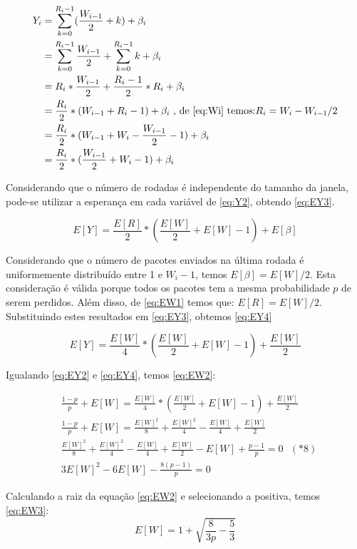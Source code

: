 \begin{align} \label{eq:Y2}
\nonumber Y_i &= \sum_{k = 0}^{R_i - 1} (\frac{W_{i - 1}}{2} + k) + \beta_i \\
\nonumber &= \sum_{k = 0}^{R_i - 1} \frac{W_{i - 1}}{2} + \sum_{k = 0}^{R_i - 1} k + \beta_i \\
\nonumber &= R_i * \frac{W_{i - 1}}{2} + \frac{R_i - 1}{2} * R_i + \beta_i \\
\nonumber &= \frac{R_i}{2} * (W_{i - 1} + R_i - 1) + \beta_i \text{ , de \eqref{eq:Wi} temos:$R_i = W_i - W_{i-1}/2$} \\
\nonumber &= \frac{R_i}{2} * (W_{i - 1} + W_i - \frac{W_{i-1}}{2} - 1) + \beta_i \\
&= \frac{R_i}{2} * (\frac{W_{i-1}}{2} + W_i - 1) + \beta_i 
\end{align}

Considerando que o número de rodadas é independente do tamanho da janela, pode-se utilizar
a esperança em cada variável de \eqref{eq:Y2}, obtendo \eqref{eq:EY3}.

\begin{equation} \label{eq:EY3}
E[Y] = \frac{E[R]}{2} * (\frac{E[W]}{2} + E[W] - 1) + E[\beta] 
\end{equation}

Considerando que o número de pacotes enviados na última rodada é uniformemente distribuído entre
1 e $W_i - 1$, temos $E[\beta] = E[W]/2$. Esta consideração é válida porque todos os pacotes tem 
a mesma probabilidade $p$ de serem perdidos. Além disso, de \eqref{eq:EW1} temos que: $E[R]=E[W]/2$.
Substituindo estes resultados em \eqref{eq:EY3}, obtemos \eqref{eq:EY4}

\begin{equation} \label{eq:EY4}
E[Y] = \frac{E[W]}{4} * (\frac{E[W]}{2} + E[W] - 1) + \frac{E[W]}{2}
\end{equation}

Igualando \eqref{eq:EY2} e \eqref{eq:EY4}, temos \eqref{eq:EW2}:

\begin{align} \label{eq:EW2}
\nonumber & \frac{1 - p}{p} + E[W] = \frac{E[W]}{4} * (\frac{E[W]}{2} + E[W] - 1) + \frac{E[W]}{2} \\
\nonumber & \frac{1 - p}{p} + E[W] = \frac{E[W]^2}{8} + \frac{E[W]^2}{4} - \frac{E[W]}{4} + \frac{E[W]}{2} \\
\nonumber & \frac{E[W]^2}{8} + \frac{E[W]^2}{4} - \frac{E[W]}{4} + \frac{E[W]}{2} - E[W] + \frac{p - 1}{p} = 0 \text{   $(*8)$}\\
& 3E[W]^2 - 6E[W] - \frac{8(p - 1)}{p} = 0
\end{align}

Calculando a raiz da equação \eqref{eq:EW2} e selecionando a positiva, temos \eqref{eq:EW3}:
\begin{equation} \label{eq:EW3}
E[W] = 1 + \sqrt{\frac{8}{3p} - \frac{5}{3}}
\end{equation}

